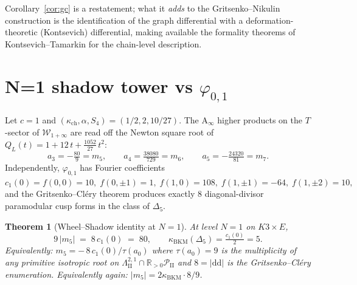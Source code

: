 \documentclass[11pt]{article}
\newtheorem{theorem}{Theorem}
\newcommand{\kch}{\kappa_{\mathrm{ch}}}
\newcommand{\kBKM}{\kappa_{\mathrm{BKM}}}
\newcommand{\Winf}{\mathcal{W}_{1+\infty}}
\newcommand{\LII}{\Lambda^{2,1}_{\mathrm{II}}}
\newcommand{\PII}{\mathcal{P}_{\mathrm{II}}}
\newcommand{\phii}{\varphi_{0,1}}
\newcommand{\Dlt}{\Delta_5}
\begin{document}
Corollary~\ref{cor:gc} is a restatement; what it \emph{adds} to the
Gritsenko--Nikulin construction is the identification of the graph
differential with a deformation-theoretic (Kontsevich) differential,
making available the formality theorems of
Kontsevich--Tamarkin for the chain-level description.

\section{N=1 shadow tower vs $\phii$}

Let $c=1$ and $(\kch,\alpha,S_4)=(1/2,2,10/27)$. The A$_\infty$
higher products on the $T$-sector of $\Winf$ are read off the Newton
square root of
$Q_L(t) = 1 + 12\,t + \tfrac{1052}{27}\,t^2$:
\[
a_3 = -\tfrac{80}{9} = m_5,\qquad
a_4 = \tfrac{38080}{729} = m_6,\qquad
a_5 = -\tfrac{24320}{81}=m_7.
\]
Independently, $\phii$ has Fourier coefficients
\(
c_1(0)=f(0,0)=10,\;f(0,\pm 1)=1,\;f(1,0)=108,\;f(1,\pm 1)=-64,\;
f(1,\pm 2)=10,
\)
and the Gritsenko--Cl{\'e}ry theorem produces exactly $8$ diagonal-divisor
paramodular cusp forms in the class of $\Dlt$.

\begin{theorem}[Wheel--Shadow identity at $N=1$]\label{thm:key}
At level $N=1$ on $K3\times E$,
\[
9\,|m_5|\;=\;8\,c_1(0)\;=\;80,
\qquad
\kBKM(\Dlt)=\tfrac{c_1(0)}{2}=5.
\]
Equivalently:
$m_5 = -\,8\,c_1(0)/\tau(a_0)$
where $\tau(a_0)=9$ is the multiplicity of any primitive isotropic
root on $\LII\cap\mathbb{R}_{>0}\PII$ and $8=|\mathrm{dd}|$ is the
Gritsenko--Cl{\'e}ry enumeration. Equivalently again:
$|m_5| = 2\kBKM\cdot 8/9$.
\end{theorem}
\end{document}
